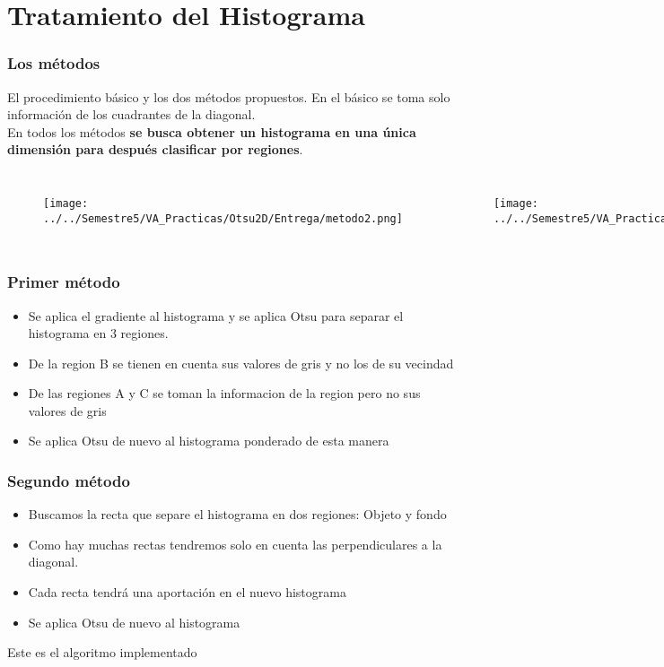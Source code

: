 \documentclass{beamer}
\begin{document}
\section{Tratamiento del Histograma}
\begin{frame}
\frametitle{Los métodos}
El procedimiento básico y los dos métodos propuestos. En el básico se toma solo información de los cuadrantes de la diagonal.\\
En todos los métodos \textbf{se busca obtener un histograma en una única dimensión para después clasificar por regiones}.
\begin{columns}[t] %
\begin{figure}
\texttt{[image: ../../Semestre5/VA\_Practicas/Otsu2D/Entrega/metodo2.png]}

\end{figure}

\begin{figure}
\texttt{[image: ../../Semestre5/VA\_Practicas/Otsu2D/Entrega/metodo1.png]}
\end{figure}

\end{columns}
\end{frame}

\begin{frame}
\frametitle{Primer método}
\begin{itemize}
\item Se aplica el gradiente al histograma y se aplica Otsu para separar el histograma en 3 regiones. 
\item De la region B se tienen en cuenta sus valores de gris y no los de su vecindad 
\item De las regiones A y C se toman la informacion de la region pero no sus valores de gris
\item Se aplica Otsu de nuevo al histograma ponderado de esta manera
\end{itemize}
\end{frame}

\begin{frame}
\frametitle{Segundo método}
\begin{itemize}
\item Buscamos la recta que separe el histograma en dos regiones: Objeto y fondo
\item Como hay muchas rectas tendremos solo en cuenta las perpendiculares a la diagonal.
\item Cada recta tendrá una aportación en el nuevo histograma
\item Se aplica Otsu de nuevo al histograma
\end{itemize}
Este es el algoritmo implementado
\end{frame}
\end{document}
